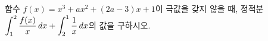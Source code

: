 함수 $f(x)=x^3+ax^2+(2a-3)x+1$이 극값을 갖지 않을 때, 정적분 $\displaystyle\int_{1}^{2}\dfrac{f(x)}{x}\mkern3mu dx+\int_{2}^{1}\dfrac{1}{x}\mkern3mu dx$의 값을 구하시오. 
